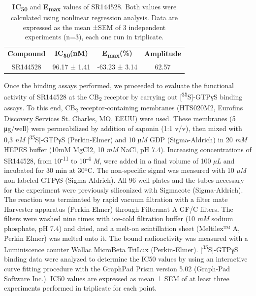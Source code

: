 \documentclass[empirical, authordate, issue]{jote-new-article}
\begin{document}
\begin{table}[t]
  \begin{fullwidth}
    \caption{\textbf{IC}\textsubscript{\textbf{50}} and \textbf{E}\textsubscript{\textbf{max}}\textsubscript{ }values of SR144528. Both values were calculated using nonlinear regression analysis. Data are expressed as the mean ±SEM of 3 independent experiments (n=3), each one run in triplicate.}
    \label{tab:2}
    \begin{tabular}{c  c  c  c}
      \textbf{Compound } & \textbf{IC\textsubscript{50}(nM)} & \textbf{E\textsubscript{max}(\%) } & \textbf{Amplitude } \\
      SR144528           & 96.17 ± 1.41                      & -63.23 ± 3.14                      & 62.57               \\
    \end{tabular}
  \end{fullwidth}
\end{table}

Once the binding assays performed, we proceeded to evaluate the functional activity of SR144528 at the CB\textsubscript{2} receptor by carrying out [\textsuperscript{35}S]-GTPγS binding assays. To this end, CB\textsubscript{2} receptor-containing membranes (HTS020M2, Eurofins Discovery Services St. Charles, MO, EEUU) were used. These membranes (5 μg/well) were permeabilized by addition of saponin (1:1 v/v), then mixed with 0,3 \emph{nM} [\textsuperscript{35}S]-GTPγS (Perkin-Elmer) and 10 \emph{μM} GDP (Sigma-Aldrich) in 20 \emph{mM} HEPES buffer (10mM MgCl2, 10 \emph{mM} NaCl, pH 7.4). Increasing concentrations of SR144528, from 10\textsuperscript{-11} to 10\textsuperscript{-4} \emph{M}, were added in a final volume of 100 \emph{µL} and incubated for 30 min at 30ºC. The non-specific signal was measured with 10 \emph{µM} non-labeled GTPγS (Sigma-Aldrich). All 96-well plates and the tubes necessary for the experiment were previously siliconized with Sigmacote (Sigma-Aldrich). The reaction was terminated by rapid vacuum filtration with a filter mate Harvester apparatus (Perkin-Elmer) through Filtermat A GF/C filters. The filters were washed nine times with ice-cold filtration buffer (10 \emph{mM} sodium phosphate, pH 7.4) and dried, and a melt-on scintillation sheet (Meltilex™ A, Perkin Elmer) was melted onto it. The bound radioactivity was measured with a Luminiscence counter Wallac MicroBeta TriLux (Perkin-Elmer). [\textsuperscript{35}S]-GTPγS binding data were analyzed to determine the IC50 values by using an interactive curve fitting procedure with the GraphPad Prism version 5.02 (Graph-Pad Software Inc.). IC50 values are expressed as mean ± SEM of at least three experiments performed in triplicate for each point.
\end{document}
